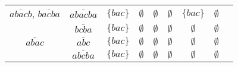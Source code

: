 \begin{tabular}{|c| c |c c| c c| c c |c |}
\multirow{1}{*}{$\overline{abacb}$, $\overline{bacba}$ }&\multirow{1}{*}{$\overline{abacba}$}&$\{bac\}$&$\emptyset$ &$\emptyset$ &$\emptyset$ &$\{bac\}$& $\emptyset$ \\  
 \rowcolor{gray!10}\multirow{1}{*}{$\overline{bacba}$ }&\multirow{1}{*}{$\overline{bcba}$}&$\{bac\}$&$\emptyset$ &$\emptyset$ &$\emptyset$ &$\emptyset$& $\emptyset$\\ \hline
 \hline
\multirow{1}{*}{$\overline{abac}$ }&\multirow{1}{*}{$\overline{abc}$}&$\{bac\}$&$\emptyset$ &$\emptyset$ &$\emptyset$ &$\emptyset$& $\emptyset$\\ 
 \rowcolor{gray!10}\multirow{1}{*}{$\overline{abacba}$ }&\multirow{1}{*}{$\overline{abcba}$}&$\{bac\}$&$\emptyset$ &$\emptyset$ &$\emptyset$ &$\emptyset$& $\emptyset$\\\hline
\end{tabular}
